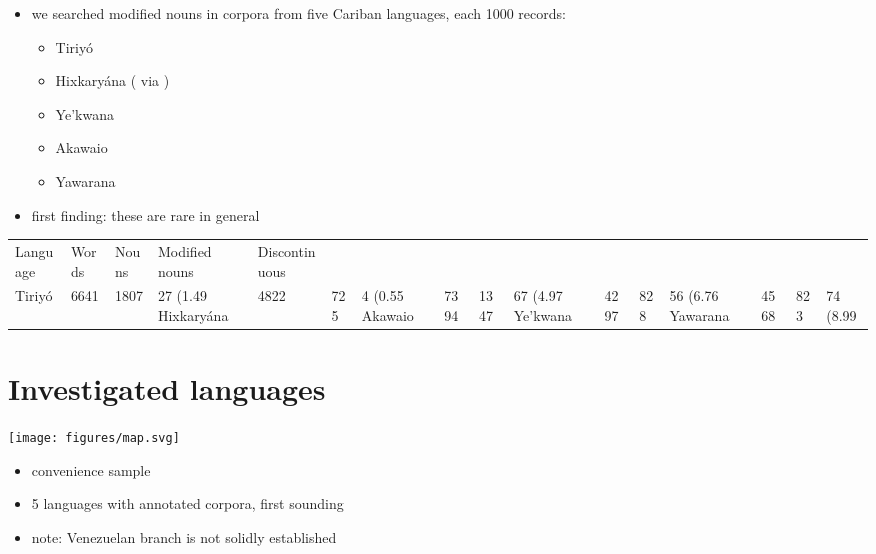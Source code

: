 \documentclass[10pt]{article}
\begin{document}
\begin{itemize}
\tightlist
\item
  we searched modified nouns in corpora from five Cariban languages,
  each 1000 records:

  \begin{itemize}
  \tightlist
  \item
    Tiriyó \parencites{meiraDBtrio}
  \item
    Hixkaryána (\textcites{derbyshire1965textos} via
    \textcites{meiraDBhixka})
  \item
    Ye'kwana \parencites{caceresDByekwana}
  \item
    Akawaio \parencites{akawaiocaesar2003}
  \item
    Yawarana \parencites{caceres2020flex}
  \end{itemize}
\item
  first finding: these are rare in general
\end{itemize}\begin{tabular}[t]{lllll}

  Language & Words & Nouns & Modified nouns & Discontinuous \\

    Tiriyó &  6641 &  1807 &     27 (1.49%
Hixkaryána &  4822 &   725 &      4 (0.55%
   Akawaio &  7394 &  1347 &     67 (4.97%
  Ye'kwana &  4297 &   828 &     56 (6.76%
  Yawarana &  4568 &   823 &     74 (8.99%

\end{tabular}

\section{Investigated languages}

\texttt{[image: figures/map.svg]}

\begin{itemize}
\tightlist
\item
  convenience sample
\item
  5 languages with annotated corpora, first sounding
\item
  note: Venezuelan branch is not solidly established
\end{itemize}
\end{document}
